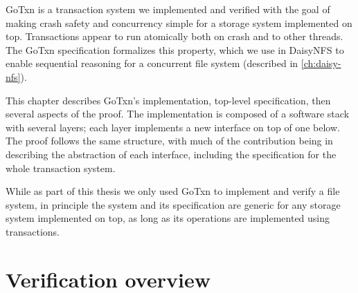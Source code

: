GoTxn is a transaction system we implemented and verified with the goal of
making crash safety and concurrency simple for a storage system implemented on
top. Transactions appear to run atomically both on crash and to other threads.
The GoTxn specification formalizes this property, which we use in DaisyNFS to
enable sequential reasoning for a concurrent file system (described in
\cref{ch:daisy-nfs}).

This chapter describes GoTxn's implementation, top-level specification, then
several aspects of the proof. The implementation is composed of a software stack
with several layers; each layer implements a new interface on top of one
below. The proof follows the same structure, with much of the contribution being
in describing the abstraction of each interface, including the specification for
the whole transaction system.

While as part of this thesis we only used GoTxn to implement and verify a file
system, in principle the system and its specification are generic for any
storage system implemented on top, as long as its operations are implemented
using transactions.




%

\section{Verification overview}%
\label{sec:gotxn:overview}


\resume

%



